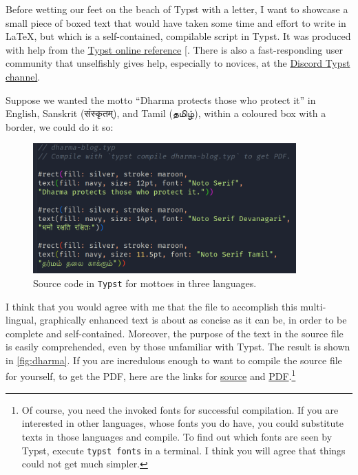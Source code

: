 \documentclass[
  a4paper,
]{article}
\begin{document}
Before wetting our feet on the beach of Typst with a letter, I want to
showcase a small piece of boxed text that would have taken some time and
effort to write in LaTeX, but which is a self-contained, compilable
script in Typst. It was produced with help from the
\href{https://typst.app/docs/reference/}{Typst online reference}
{[}\citeproc{ref-typstref}{4}{]}. There is also a fast-responding user
community that unselfishly gives help, especially to novices, at the
\href{https://discord.com/channels/1054443721975922748/1088372909111783525}{Discord
Typst channel}.

Suppose we wanted the motto ``Dharma protects those who protect it'' in
English, Sanskrit (संस्कृतम्), and Tamil (தமிழ்), within a coloured box with
a border, we could do it so:

\begin{figure}
\centering
\includegraphics[width=0.9\textwidth,height=\textheight]{images/dharma-source.png}
\caption{Source code in \texttt{Typst} for mottoes in three
languages.}\label{fig:dharma-source}
\end{figure}

I think that you would agree with me that the file to accomplish this
multi-lingual, graphically enhanced text is about as concise as it can
be, in order to be complete and self-contained. Moreover, the purpose of
the text in the source file is easily comprehended, even by those
unfamiliar with Typst. The result is shown in \cref{fig:dharma}. If you
are incredulous enough to want to compile the source file for yourself,
to get the PDF, here are the links for
\href{auxiliary/dharma-blog.typ}{source} and
\href{auxiliary/dharma-blog.pdf}{PDF}.\footnote{Of course, you need the
  invoked fonts for successful compilation. If you are interested in
  other languages, whose fonts you do have, you could substitute texts
  in those languages and compile. To find out which fonts are seen by
  Typst, execute \texttt{typst\ fonts} in a terminal. I think you will
  agree that things could not get much simpler.}
\end{document}
